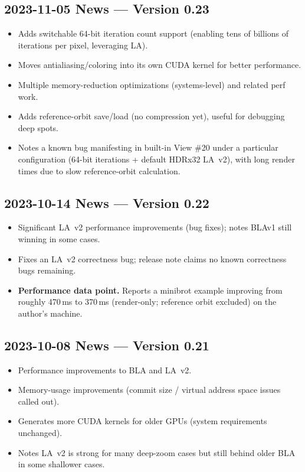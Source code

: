 \subsection{2023-11-05 News --- Version 0.23}
\begin{itemize}
  \item Adds switchable 64-bit iteration count support (enabling tens of
  billions of iterations per pixel, leveraging LA).
  \item Moves antialiasing/coloring into its own CUDA kernel for better
  performance.
  \item Multiple memory-reduction optimizations (systems-level) and related perf
  work.
  \item Adds reference-orbit save/load (no compression yet), useful for
  debugging deep spots.
  \item Notes a known bug manifesting in built-in View \#20 under a particular
  configuration (64-bit iterations + default HDRx32 LA~v2), with long render
  times due to slow reference-orbit calculation.
\end{itemize}


\subsection{2023-10-14 News --- Version 0.22}

\begin{itemize}

  \item Significant LA~v2 performance improvements (bug fixes); notes BLAv1 still
  winning in some cases.

  \item Fixes an LA~v2 correctness bug; release note claims no known correctness
  bugs remaining.

  \item \textbf{Performance data point.} Reports a minibrot example improving
  from roughly 470\,ms to 370\,ms (render-only; reference orbit excluded) on the
  author’s machine.

\end{itemize}


\subsection{2023-10-08 News --- Version 0.21}
\begin{itemize}
  \item Performance improvements to BLA and LA~v2.
  \item Memory-usage improvements (commit size / virtual address space issues
  called out).
  \item Generates more CUDA kernels for older GPUs (system requirements
  unchanged).
  \item Notes LA~v2 is strong for many deep-zoom cases but still behind older BLA
  in some shallower cases.
\end{itemize}


